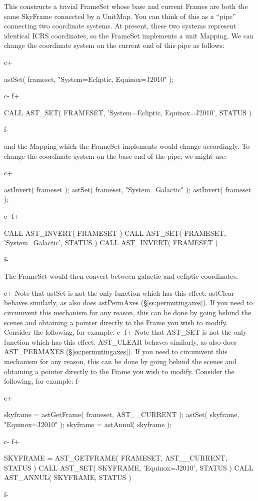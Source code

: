 \documentclass[twoside,11pt]{starlink}
\providecommand{\secref}[1]{\S\ref{#1}}
\begin{document}
{This constructs a trivial FrameSet whose base and current Frames are
both the same SkyFrame connected by a UnitMap. You can think of this
as a ``pipe'' connecting two coordinate systems. At present, these two
systems represent identical ICRS coordinates, so the FrameSet
implements a unit Mapping. We can change the coordinate system on the
current end of this pipe as follows:

c+
\small
\begin{terminalv}
astSet( frameset, "System=Ecliptic, Equinox=J2010" );
\end{terminalv}
\normalsize
c-
f+
\small
\begin{terminalv}
      CALL AST_SET( FRAMESET, 'System=Ecliptic, Equinox=J2010', STATUS )
\end{terminalv}
\normalsize
f-

and the Mapping which the FrameSet implements would change
accordingly. To change the coordinate system on the base end of the
pipe, we might use:

c+
\small
\begin{terminalv}
astInvert( frameset );
astSet( frameset, "System=Galactic" );
astInvert( frameset );
\end{terminalv}
\normalsize
c-
f+
\small
\begin{terminalv}
      CALL AST_INVERT( FRAMESET )
      CALL AST_SET( FRAMESET, 'System=Galactic', STATUS )
      CALL AST_INVERT( FRAMESET )
\end{terminalv}
\normalsize
f-

The FrameSet would then convert between galactic and ecliptic
coordinates.

c+
Note that astSet is not the only function which has this effect:
astClear behaves similarly, as also does astPermAxes
(\secref{ss:permutingaxes}). If you need to circumvent this mechanism
for any reason, this can be done by going behind the scenes and
obtaining a pointer directly to the Frame you wish to modify. Consider
the following, for example:
c-
f+
Note that AST\_SET is not the only function which has this effect:
AST\_CLEAR behaves similarly, as also does AST\_PERMAXES
(\secref{ss:permutingaxes}). If you need to circumvent this mechanism
for any reason, this can be done by going behind the scenes and
obtaining a pointer directly to the Frame you wish to modify. Consider
the following, for example:
f-

c+
\small
\begin{terminalv}
skyframe = astGetFrame( frameset, AST__CURRENT );
astSet( skyframe, "Equinox=J2010" );
skyframe = astAnnul( skyframe );
\end{terminalv}
\normalsize
c-
f+
\small
\begin{terminalv}
      SKYFRAME = AST_GETFRAME( FRAMESET, AST__CURRENT, STATUS )
      CALL AST_SET( SKYFRAME, 'Equinox=J2010', STATUS )
      CALL AST_ANNUL( SKYFRAME, STATUS )
\end{terminalv}
\normalsize
f-

}
\end{document}
